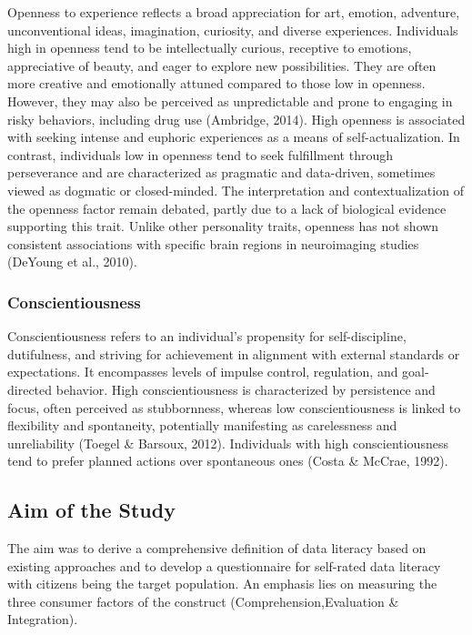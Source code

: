 \documentclass[
  12pt,
  a4paper,
  twoside]{article}
\begin{document}
Openness to experience reflects a broad appreciation for art, emotion, adventure, unconventional ideas, imagination, curiosity, and diverse experiences. Individuals high in openness tend to be intellectually curious, receptive to emotions, appreciative of beauty, and eager to explore new possibilities. They are often more creative and emotionally attuned compared to those low in openness. However, they may also be perceived as unpredictable and prone to engaging in risky behaviors, including drug use (Ambridge, 2014). High openness is associated with seeking intense and euphoric experiences as a means of self-actualization. In contrast, individuals low in openness tend to seek fulfillment through perseverance and are characterized as pragmatic and data-driven, sometimes viewed as dogmatic or closed-minded. The interpretation and contextualization of the openness factor remain debated, partly due to a lack of biological evidence supporting this trait. Unlike other personality traits, openness has not shown consistent associations with specific brain regions in neuroimaging studies (DeYoung et al., 2010).

\subsubsection{Conscientiousness}\label{conscientiousness}

Conscientiousness refers to an individual's propensity for self-discipline, dutifulness, and striving for achievement in alignment with external standards or expectations. It encompasses levels of impulse control, regulation, and goal-directed behavior. High conscientiousness is characterized by persistence and focus, often perceived as stubbornness, whereas low conscientiousness is linked to flexibility and spontaneity, potentially manifesting as carelessness and unreliability (Toegel \& Barsoux, 2012). Individuals with high conscientiousness tend to prefer planned actions over spontaneous ones (Costa \& McCrae, 1992).

\subsection{Aim of the Study}\label{aim-of-the-study}

The aim was to derive a comprehensive definition of data literacy based on existing approaches and to develop a questionnaire for self-rated data literacy with citizens being the target population. An emphasis lies on measuring the three consumer factors of the construct (Comprehension,Evaluation \& Integration).
\end{document}
